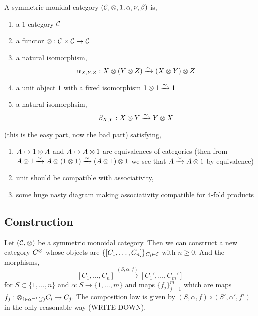\documentclass[12pt]{article}
\begin{document}
\begin{defn}
A symmetric monidal category $(\mathcal{C}, \otimes, 1, \alpha, \nu, \beta)$ is,
\begin{enumerate}
\item a $1$-category $\mathcal{C}$
\item a functor $\otimes : \mathcal{C} \times \mathcal{C} \to \mathcal{C}$
\item a natural isomorphism,
\[ \alpha_{X,Y,Z} : X \otimes (Y \otimes Z) \xrightarrow{\sim} (X \otimes Y) \otimes Z \]
\item a unit object $1$ with a fixed isomorphism $1 \otimes 1 \xrightarrow{\sim} 1$
\item a natural isomorphsim,
\[ \beta_{X,Y} : X \otimes Y \xrightarrow{\sim} Y \otimes X \]
\end{enumerate}
(this is the easy part, now the bad part) satisfying,
\begin{enumerate}
\item $A \mapsto 1 \otimes A$ and $A \mapsto A \otimes 1$ are equivalences of categories (then from $A \otimes 1 \xrightarrow{\sim} A \otimes (1 \otimes 1) \xrightarrow{\sim} (A \otimes 1) \otimes 1$ we see that $A \xrightarrow{\sim} A \otimes 1$ by equivalence) 
\item unit should be compatible with associativity,
\begin{center}
\end{center}

\item some huge nasty diagram making associativity compatible for 4-fold products
\end{enumerate}
\end{defn}

\subsection{Construction}

Let $(\mathcal{C}, \otimes)$ be a symmetric monoidal category. Then we can construct a new category $C^{\otimes}$ whose objects are $\{ [C_1, \dots, C_n] \}_{C_i \in \mathcal{C}}$ with $n \ge 0$. And the morphisms,
\[ [C_1, \dots, C_n] \xrightarrow{(S, \alpha, f)} [C_1', \dots, C_m'] \]
for $S \subset \{ 1, \dots, n \}$ and $\alpha : S \to \{ 1, \dots, m \}$ and maps $\{ f_j \}^m_{j = 1}$ which are maps $f_j : \otimes_{i \in \alpha^{-1}(j)} C_i \to C_j$. The composition law is given by $(S, \alpha, f) \circ (S', \alpha', f')$ in the only reasonable way (WRITE DOWN). 
\end{document}
